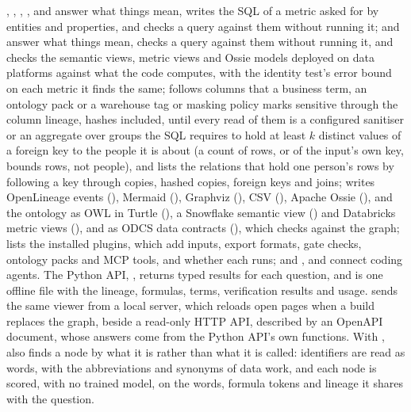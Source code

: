 ,
, , , 
and  answer what things mean,  writes the
SQL of a metric asked for by entities and properties, and
 checks a query against them without running it;
and  answer what things mean,
 checks a query against them without running it, and
 checks the semantic views, metric views and Ossie models deployed on
data platforms against what the code computes, with the identity test's error bound on each
metric it finds the same;
 follows columns that a business term, an ontology pack or a warehouse
tag or masking policy marks sensitive through the column lineage, hashes included, until every
read of them is a configured sanitiser or an aggregate over groups the SQL requires to hold at
least $k$ distinct values of a foreign key to the people it is about (a count of rows, or of the
input's own key, bounds rows, not people), and
 lists the relations that hold one person's rows by following a key
through copies, hashed copies, foreign keys and joins;
 writes OpenLineage events (), Mermaid (),
Graphviz (), CSV (), Apache Ossie (), and the ontology as OWL in
Turtle (), a Snowflake semantic view () and Databricks metric views
(), and as ODCS data contracts (), which
 checks against the graph; 
lists the installed plugins, which add inputs, export formats, gate checks, ontology packs and
MCP tools, and whether each runs; and ,  and
 connect coding agents. The Python API, , returns
typed results for each question, and  is one offline file with the lineage,
formulas, terms, verification results and usage.  sends the same viewer from
a local server, which reloads open pages when a build replaces the graph, beside a read-only HTTP
API, described by an OpenAPI document, whose answers come from the Python API's own functions.
With ,  also finds a node by what it is rather than what it
is called: identifiers are read as words, with the abbreviations and synonyms of data work, and
each node is scored, with no trained model, on the words, formula tokens and lineage it shares
with the question.

